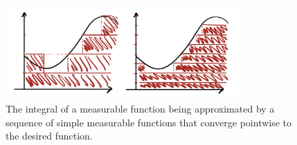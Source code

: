 \documentclass{article}
\theoremstyle{remark}
\begin{document}
\begin{enumerate}[leftmargin=*]
    \begin{figure}
        \centering
        \includegraphics[width=0.8\textwidth]{lebesgue.jpeg}
        \caption{The integral of a measurable function being approximated by a sequence of simple measurable 
        functions that converge pointwise to the desired function.}
        \label{fig:lebesgue}
    \end{figure}
\end{enumerate}
\end{document}
